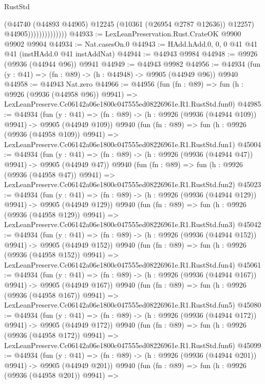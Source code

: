 \begin{lexlean}{RustStd}
\begin{coremodule}
                                (@44740
                                  (@44893 @44905)
                                  @12245
                                  (@10361 (@26954 @2787 @12636))
                                  @12257)
                                @44905))))))))))))))
@44933 := LexLeanPreservation.Rust.CrateOK @9900 @9902 @9904
@44934 := Nat.casesOn.{0}
@44943 := HAdd.hAdd.{0, 0, 0} @41 @41 @41 (instHAdd.{0} @41 instAddNat)
@44944 := @44943 @9984
@44948 := @9926 (@9936 (@44944 @96)) @9941
@44949 := @44943 @9982
@44956 := @44934 (fun (y : @41) => (fn : @89) -> (h : @44948) -> @9905 (@44949 @96)) @9940
@44958 := @44943 Nat.zero
@44966 := @44956
    (fun (fn : @89) =>
    fun (h : @9926 (@9936 (@44958 @96)) @9941) =>
    LexLeanPreserve.Cc06142a06e1800c047555ed08226961e.R1.RustStd.fun0)
@44985 := @44934
    (fun (y : @41) => (fn : @89) -> (h : @9926 (@9936 (@44944 @109)) @9941) -> @9905 (@44949 @109))
    @9940
    (fun (fn : @89) =>
    fun (h : @9926 (@9936 (@44958 @109)) @9941) =>
    LexLeanPreserve.Cc06142a06e1800c047555ed08226961e.R1.RustStd.fun1)
@45004 := @44934
    (fun (y : @41) => (fn : @89) -> (h : @9926 (@9936 (@44944 @47)) @9941) -> @9905 (@44949 @47))
    @9940
    (fun (fn : @89) =>
    fun (h : @9926 (@9936 (@44958 @47)) @9941) =>
    LexLeanPreserve.Cc06142a06e1800c047555ed08226961e.R1.RustStd.fun2)
@45023 := @44934
    (fun (y : @41) => (fn : @89) -> (h : @9926 (@9936 (@44944 @129)) @9941) -> @9905 (@44949 @129))
    @9940
    (fun (fn : @89) =>
    fun (h : @9926 (@9936 (@44958 @129)) @9941) =>
    LexLeanPreserve.Cc06142a06e1800c047555ed08226961e.R1.RustStd.fun3)
@45042 := @44934
    (fun (y : @41) => (fn : @89) -> (h : @9926 (@9936 (@44944 @152)) @9941) -> @9905 (@44949 @152))
    @9940
    (fun (fn : @89) =>
    fun (h : @9926 (@9936 (@44958 @152)) @9941) =>
    LexLeanPreserve.Cc06142a06e1800c047555ed08226961e.R1.RustStd.fun4)
@45061 := @44934
    (fun (y : @41) => (fn : @89) -> (h : @9926 (@9936 (@44944 @167)) @9941) -> @9905 (@44949 @167))
    @9940
    (fun (fn : @89) =>
    fun (h : @9926 (@9936 (@44958 @167)) @9941) =>
    LexLeanPreserve.Cc06142a06e1800c047555ed08226961e.R1.RustStd.fun5)
@45080 := @44934
    (fun (y : @41) => (fn : @89) -> (h : @9926 (@9936 (@44944 @172)) @9941) -> @9905 (@44949 @172))
    @9940
    (fun (fn : @89) =>
    fun (h : @9926 (@9936 (@44958 @172)) @9941) =>
    LexLeanPreserve.Cc06142a06e1800c047555ed08226961e.R1.RustStd.fun6)
@45099 := @44934
    (fun (y : @41) => (fn : @89) -> (h : @9926 (@9936 (@44944 @201)) @9941) -> @9905 (@44949 @201))
    @9940
    (fun (fn : @89) =>
    fun (h : @9926 (@9936 (@44958 @201)) @9941) =>

\end{coremodule}
\end{lexlean}
